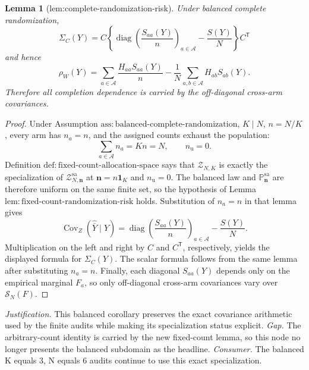 \documentclass{article}
\newtheorem{lemma}{Lemma}
\begin{document}
\begin{lemma}[lem:complete-randomization-risk]\label{lem:complete-randomization-risk}
Under balanced complete randomization, \[\Sigma_C(Y)=C\left\{\operatorname{diag}\left(\frac{S_{aa}(Y)}{n}\right)_{a\in\mathcal A}-\frac{S(Y)}{N}\right\}C^{\mathsf T}\] and hence \[\rho_W(Y)=\sum_{a\in\mathcal A}\frac{H_{aa}S_{aa}(Y)}{n}-\frac{1}{N}\sum_{a,b\in\mathcal A}H_{ab}S_{ab}(Y).\] Therefore all completion dependence is carried by the off-diagonal cross-arm covariances.
\end{lemma}
\begin{proof}
Under Assumption \(\mathrm{ass{:}balanced\text{-}complete\text{-}randomization}\), \(K\mid N\), \(n=N/K\), every arm has \(n_a=n\), and the assigned counts exhaust the population:
\[
\sum_{a\in\mathcal A}n_a=Kn=N,
\qquad n_{\mathrm u}=0.
\]
Definition \(\mathrm{def{:}fixed\text{-}count\text{-}allocation\text{-}space}\) says that \(\mathcal Z_{N,K}\) is exactly the specialization of \(\mathcal Z_{N,\mathbf n}^{\mathrm{sa}}\) at \(\mathbf n=n\mathbf 1_K\) and \(n_{\mathrm u}=0\). The balanced law and \(\mathbb P_{\mathbf n}^{\mathrm{sa}}\) are therefore uniform on the same finite set, so the hypothesis of Lemma \(\mathrm{lem{:}fixed\text{-}count\text{-}randomization\text{-}risk}\) holds. Substitution of \(n_a=n\) in that lemma gives
\[
\operatorname{Cov}_Z(\widehat{\bar Y}\mid Y)
=\operatorname{diag}\left(\frac{S_{aa}(Y)}n\right)_{a\in\mathcal A}-\frac{S(Y)}N.
\]
Multiplication on the left and right by \(C\) and \(C^{\mathsf T}\), respectively, yields the displayed formula for \(\Sigma_C(Y)\). The scalar formula follows from the same lemma after substituting \(n_a=n\). Finally, each diagonal \(S_{aa}(Y)\) depends only on the empirical marginal \(F_a\), so only off-diagonal cross-arm covariances vary over \(\mathcal S_N(F)\).
\end{proof}
\par\smallskip\noindent \textit{Justification.} This balanced corollary preserves the exact covariance arithmetic used by the finite audits while making its specialization status explicit. \textit{Gap.} The arbitrary-count identity is carried by the new fixed-count lemma, so this node no longer presents the balanced subdomain as the headline. \textit{Consumer.} The balanced K equals 3, N equals 6 audits continue to use this exact specialization.
\end{document}
